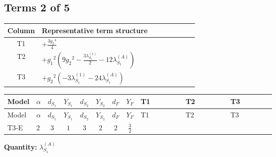 \documentclass[8pt]{article}
\begin{document}
\begin{landscape}
\subsection*{Terms 2 of 5}
\begin{center}
\begin{tabular}{@{}c >{\raggedright\arraybackslash}p{0.82\linewidth}@{}}
\toprule
Column & Representative term structure \\
\midrule
T1 & \(\displaystyle +\frac{3 {g_2}^4}{4}\) \\
\midrule
T2 & \(\displaystyle +{g_1}^2 \left(9 {g_2}^2-\frac{3 {\lambda_{S_1}^{(1)}}}{2}-12 {\lambda_{S_1}^{(A)}}\right)\) \\
\midrule
T3 & \(\displaystyle +{g_2}^2 (-3 {\lambda_{S_1}^{(1)}}-24 {\lambda_{S_1}^{(A)}})\) \\
\midrule
\bottomrule
\end{tabular}
\end{center}
\smallskip
\tiny
\begin{longtable}{@{}llcccccc >{\raggedright\arraybackslash}p{0.21\linewidth} >{\raggedright\arraybackslash}p{0.21\linewidth} >{\raggedright\arraybackslash}p{0.21\linewidth}@{}}
\toprule
Model & $\alpha$ & $d_{S_1}$ & $Y_{S_1}$ & $d_{S_2}$ & $Y_{S_2}$ & $d_F$ & $Y_F$ & T1 & T2 & T3 \\
\midrule
\endfirsthead
\toprule
Model & $\alpha$ & $d_{S_1}$ & $Y_{S_1}$ & $d_{S_2}$ & $Y_{S_2}$ & $d_F$ & $Y_F$ & T1 & T2 & T3 \\
\midrule
\endhead
T3-E & $2$ & $3$ & $1$ & $3$ & $2$ & $2$ & $\frac{3}{2}$ & \scriptsize\adjustbox{max width=\linewidth}{$\begin{gathered} +\frac{3 {g_2}^4}{4}\end{gathered}$} & \scriptsize\adjustbox{max width=\linewidth}{$\begin{gathered} +{g_1}^2 \left(9 {g_2}^2-\frac{3 {\lambda_{S_1}^{(1)}}}{2}-12 {\lambda_{S_1}^{(A)}}\right)\end{gathered}$} & \scriptsize\adjustbox{max width=\linewidth}{$\begin{gathered} +{g_2}^2 (-3 {\lambda_{S_1}^{(1)}}-24 {\lambda_{S_1}^{(A)}})\end{gathered}$} \\
\midrule
\bottomrule
\end{longtable}
\clearpage
\noindent\textbf{Quantity: }$\lambda_{S_1}^{(A)}$\par\smallskip

\end{landscape}
\end{document}
